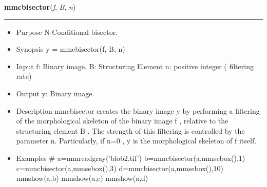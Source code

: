     \begin{boxedminipage}{\textwidth}

    \raggedright \textbf{mmcbisector}(\textit{f}, \textit{B}, \textit{n})

    \vspace{-1.5ex}

    \rule{\textwidth}{0.5\fboxrule}
    \begin{itemize}
    \setlength{\parskip}{0.6ex}
      \item Purpose N-Conditional bisector.

      \item Synopsis y = mmcbisector(f, B, n)

      \item Input f: Binary image. B: Structuring Element n: positive integer 
        ( filtering rate)

      \item Output y: Binary image.

      \item Description mmcbisector creates the binary image y by performing 
        a filtering of the morphological skeleton of the binary image f , 
        relative to the structuring element B . The strength of this 
        filtering is controlled by the parameter n. Particularly, if n=0 
        , y is the morphological skeleton of f itself.

      \item Examples \# a=mmreadgray('blob2.tif') 
        b=mmcbisector(a,mmsebox(),1) c=mmcbisector(a,mmsebox(),3) 
        d=mmcbisector(a,mmsebox(),10) mmshow(a,b) mmshow(a,c) mmshow(a,d)

    \end{itemize}

    \vspace{1ex}

    \end{boxedminipage}

    \label{multireg:num_pymorph:mmcdil}
    \vspace{0.5ex}

